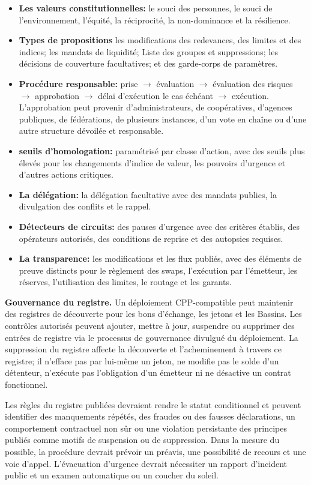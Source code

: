 \documentclass[11pt]{article}
\begin{document}
\begin{itemize}[leftmargin=*]
\item \textbf{Les valeurs constitutionnelles:} le souci des personnes, le souci de l'environnement, l'équité, la réciprocité, la non-dominance et la résilience.
\item \textbf{Types de propositions} les modifications des redevances, des limites et des indices; les mandats de liquidité; Liste des groupes et suppressions; les décisions de couverture facultatives; et des garde-corps de paramètres.
\item \textbf{Procédure responsable:} prise $\to$ évaluation $\to$ évaluation des risques $\to$ approbation $\to$ délai d'exécution le cas échéant $\to$ exécution. L'approbation peut provenir d'administrateurs, de coopératives, d'agences publiques, de fédérations, de plusieurs instances, d'un vote en chaîne ou d'une autre structure dévoilée et responsable.
\item \textbf{seuils d'homologation:} paramétrisé par classe d'action, avec des seuils plus élevés pour les changements d'indice de valeur, les pouvoirs d'urgence et d'autres actions critiques.
\item \textbf{La délégation:} la délégation facultative avec des mandats publics, la divulgation des conflits et le rappel.
\item \textbf{Détecteurs de circuits:} des pauses d'urgence avec des critères établis, des opérateurs autorisés, des conditions de reprise et des autopsies requises.
\item \textbf{La transparence:} les modifications et les flux publiés, avec des éléments de preuve distincts pour le règlement des swaps, l'exécution par l'émetteur, les réserves, l'utilisation des limites, le routage et les garants.
\end{itemize}
\textbf{Gouvernance du registre.} Un déploiement CPP-compatible peut maintenir des registres de découverte pour les bons d'échange, les jetons et les Bassins. Les contrôles autorisés peuvent ajouter, mettre à jour, suspendre ou supprimer des entrées de registre via le processus de gouvernance divulgué du déploiement. La suppression du registre affecte la découverte et l'acheminement à travers ce registre; il n'efface pas par lui-même un jeton, ne modifie pas le solde d'un détenteur, n'exécute pas l'obligation d'un émetteur ni ne désactive un contrat fonctionnel.

Les règles du registre publiées devraient rendre le statut conditionnel et peuvent identifier des manquements répétés, des fraudes ou des fausses déclarations, un comportement contractuel non sûr ou une violation persistante des principes publiés comme motifs de suspension ou de suppression. Dans la mesure du possible, la procédure devrait prévoir un préavis, une possibilité de recours et une voie d'appel. L'évacuation d'urgence devrait nécessiter un rapport d'incident public et un examen automatique ou un coucher du soleil.
\end{document}

